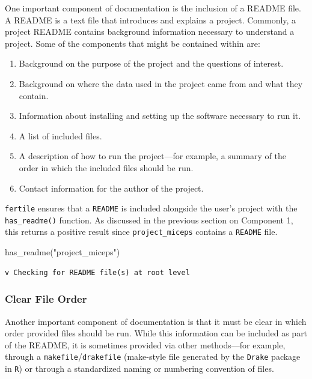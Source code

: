 \documentclass[12pt,twoside]{reedthesis}
\newenvironment{Shaded}{\begin{snugshade}}{\end{snugshade}}
\newcommand{\FunctionTok}[1]{\textcolor[rgb]{0.00,0.00,0.00}{#1}}
\newcommand{\NormalTok}[1]{#1}
\newcommand{\StringTok}[1]{\textcolor[rgb]{0.31,0.60,0.02}{#1}}
\providecommand{\tightlist}{%
  \setlength{\itemsep}{0pt}\setlength{\parskip}{0pt}}
\begin{document}
One important component of documentation is the inclusion of a README file. A README is a text file that introduces and explains a project. Commonly, a project README contains background information necessary to understand a project. Some of the components that might be contained within are:
\begin{enumerate}
\def\labelenumi{\arabic{enumi}.}
\tightlist
\item
  Background on the purpose of the project and the questions of interest.
\item
  Background on where the data used in the project came from and what they contain.
\item
  Information about installing and setting up the software necessary to run it.
\item
  A list of included files.
\item
  A description of how to run the project---for example, a summary of the order in which the included files should be run.
\item
  Contact information for the author of the project.
\end{enumerate}
\texttt{fertile} ensures that a \texttt{README} is included alongside the user's project with the \texttt{has\_readme()} function. As discussed in the previous section on Component 1, this returns a positive result since \texttt{project\_miceps} contains a \texttt{README} file.
\begin{Shaded}
\begin{Highlighting}[]
\FunctionTok{has\_readme}\NormalTok{(}\StringTok{"project\_miceps"}\NormalTok{)}
\end{Highlighting}
\end{Shaded}
\begin{verbatim}
v Checking for README file(s) at root level
\end{verbatim}
\hypertarget{clear-file-order}{%
\subsubsection{Clear File Order}\label{clear-file-order}}

Another important component of documentation is that it must be clear in which order provided files should be run. While this information can be included as part of the README, it is sometimes provided via other methods---for example, through a \texttt{makefile}/\texttt{drakefile} (make-style file generated by the \texttt{Drake} package in \texttt{R}) or through a standardized naming or numbering convention of files.
\end{document}
